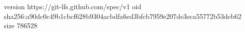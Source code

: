 version https://git-lfs.github.com/spec/v1
oid sha256:a90dc0c49b1cbcf628b9304acbdfa6ed3bfcb7959e207de3eca55772b53deb62
size 786528
